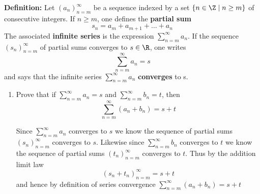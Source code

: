 \documentclass[11pt]{exam}
\newcommand{\qs}{\sum_{n=m}^{\infty}}
\newtheorem*{defn}{\textbf{Definition}}
\begin{document}

    \textbf{Definition: } Let $(a_n)_{n=m}^{\infty}$ be a sequence indexed by a set 
    $\{n \in \Z \mid  n \geq m\}$ of consecutive integers. If $n \geq m$, one defines
    the \textbf{partial sum} 
    $$s_n = a_m + a_{m+1} + \dots + a_n$$
    The associated \textbf{infinite series} is the expression $\sum_{n=m}^{\infty} a_n$.
    If the sequence $(s_n)_{n=m}^{\infty}$ of partial sums converges to $s \in \R$, one 
    writes $$\sum_{n=m}^{\infty} a_n = s$$ and says that the infinite series $\sum_{n=m}^{\infty} a_n$
    \textbf{converges} to s.

    \begin{enumerate}
        \item Prove that if $\qs a_n = s$ and $\qs b_n = t$, then 
            $$\qs (a_n + b_n) = s + t$$
            \begin{solution}
                Since $\qs a_n$ converges to $s$ we know the sequence of partial sums $(s_n)_{n=m}^{\infty}$ converges to $s$. 
                Likewise since $\qs b_n$ converges to $t$ we know the sequence of partial sums $(t_n)_{n=m}^{\infty}$ converges 
                to $t$. Thus by the addition limit law 
                $$(s_n + t_n)_{n=m}^{\infty} = s + t$$ and hence by definition of series convergence $\qs (a_n + b_n) = s + t$
            \end{solution}



\end{enumerate}
\end{document}
